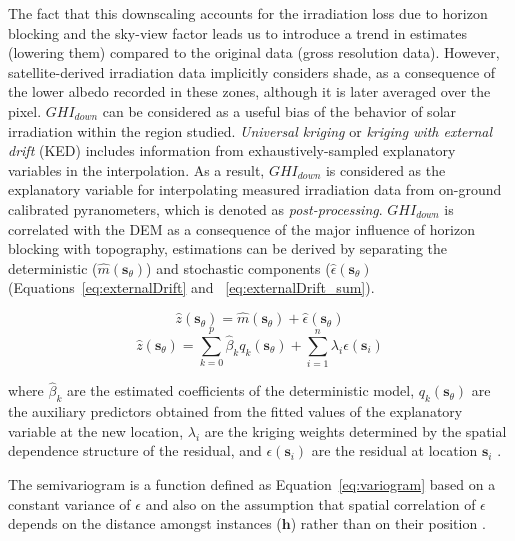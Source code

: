 \documentclass[11pt, english]{article}
\let\cite\citep
\begin{document}
The fact that this downscaling accounts for the irradiation loss due
to horizon blocking and the sky-view factor leads us to introduce a
trend in estimates (lowering them) compared to the original data
(gross resolution data). However, satellite-derived irradiation data
implicitly considers shade, as a consequence of the lower albedo
recorded in these zones, although it is later averaged over the
pixel. $GHI_{down}$ can be considered as a useful bias of the behavior
of solar irradiation within the region studied. \emph{Universal
  kriging} or \emph{kriging with external drift} (KED) includes
information from exhaustively-sampled explanatory variables in the
interpolation. As a result, $GHI_{down}$ is considered as the
explanatory variable for interpolating measured irradiation data from
on-ground calibrated pyranometers, which is denoted as
\emph{post-processing}. $GHI_{down}$ is correlated with the DEM as a
consequence of the major influence of horizon blocking with
topography, estimations can be derived by separating the deterministic
($\hat{m}(\mathbf{s}_\theta)$) and stochastic components
($\hat{\epsilon}(\mathbf{s}_\theta)$ (Equations~\ref{eq:externalDrift}
and ~\ref{eq:externalDrift_sum}).

\begin{equation}
\label{eq:externalDrift}
\hat{z}(\mathbf{\mathbf{s}}_\theta) = \hat{m}(\mathbf{s}_\theta) + \hat{\epsilon}(\mathbf{s}_\theta)
\end{equation}
\begin{equation}
\label{eq:externalDrift_sum}
\hat{z}(\mathbf{s}_\theta) = \sum_{k=0}^p \hat{\beta}_k q_k(\mathbf{s}_\theta) + 
\sum_{i=1}^n \lambda_i \epsilon(\mathbf{s}_i)
\end{equation}

where $\hat{\beta}_k$ are the estimated coefficients of the
deterministic model, $q_k(\mathbf{s}_\theta)$ are the auxiliary
predictors obtained from the fitted values of the explanatory variable
at the new location, $\lambda_i$ are the kriging weights determined by
the spatial dependence structure of the residual, and
$\epsilon(\mathbf{s}_i)$ are the residual at location $\mathbf{s}_i$
\cite{Antonanzas-Torres.Canizares.ea2013}.

The semivariogram is a function defined as Equation~\ref{eq:variogram}
based on a constant variance of $\epsilon$ and also on the assumption
that spatial correlation of $\epsilon$ depends on the distance amongst
instances ($\mathbf{h}$) rather than on their position
\cite{Pebesma2004}.
\end{document}
